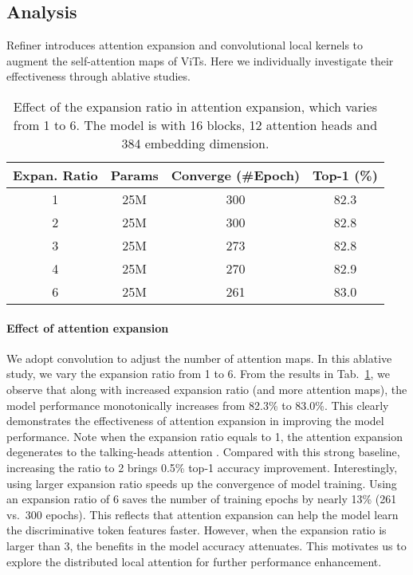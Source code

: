 \subsection{Analysis}
\label{exp:analysis}
Refiner introduces attention expansion and convolutional local kernels to augment the self-attention maps of ViTs. Here we individually investigate their effectiveness through ablative studies. 



\begin{table}[h]
    \footnotesize
    \setlength\tabcolsep{2.1pt}
    \centering
    \caption{\small  Effect of the expansion ratio in  attention expansion, which varies from 1 to 6. The model is \OURS{} with 16 blocks, 12 attention heads and 384 embedding dimension. }
\label{tab:attn_expansion_ratio}
\begin{tabular}{cccc} \toprule
    Expan. Ratio & Params & Converge  (\#Epoch) &  Top-1 (\%)\\ \midrule
     1 & 25M & 300 & 82.3\\ 
    2 & 25M & 300 & 82.8\\ 
    3 & 25M & 273 & 82.8\\
     4 & 25M & 270 & 82.9\\
    6 & 25M & 261 & 83.0\\ \bottomrule
    \end{tabular}
\end{table}


\paragraph{Effect of attention   expansion} We adopt  convolution to adjust the number of attention maps. In this ablative study, we vary the expansion ratio  from 1 to 6. From the results     in Tab.~\ref{tab:attn_expansion_ratio}, we observe that along with    increased expansion ratio (and more attention maps), the model performance   monotonically increases from 82.3\% to 83.0\%. This clearly demonstrates the effectiveness of attention expansion in improving the model performance. Note when the expansion ratio equals to 1, the attention expansion degenerates to the talking-heads attention \cite{shazeer2020talking,zhou2021deepvit}. Compared with this strong baseline, increasing the ratio to 2 brings 0.5\% top-1 accuracy improvement. Interestingly, using larger expansion ratio speeds up the convergence of model training. Using an expansion ratio of 6 saves the number of training epochs by nearly 13\% (261 vs.\ 300 epochs). This reflects that attention expansion can help   the  model learn the discriminative token features faster. However, when the expansion ratio is larger than 3, the benefits in the model accuracy attenuates. This motivates us to explore the distributed local attention for further performance enhancement.







